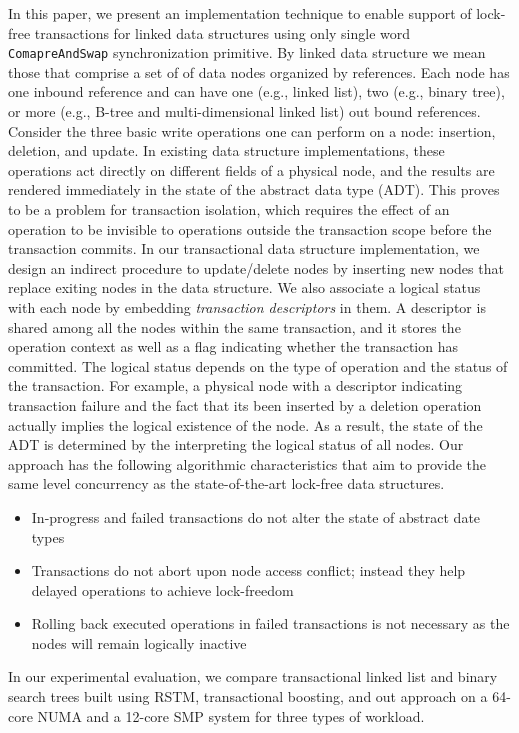 \documentclass[10pt,conference,compsocconf]{IEEEtran}
\begin{document}
In this paper, we present an implementation technique to enable support of lock-free transactions for linked data structures using only single word \texttt{ComapreAndSwap} synchronization primitive.
By linked data structure we mean those that comprise a set of of data nodes organized by references. 
Each node has one inbound reference and can have one (e.g., linked list), two (e.g., binary tree), or more (e.g., B-tree and multi-dimensional linked list) out bound references.
Consider the three basic write operations one can perform on a node: insertion, deletion, and update.
In existing data structure implementations, these operations act directly on different fields of a physical node, and the results are rendered immediately in the state of the abstract data type (ADT).
This proves to be a problem for transaction isolation, which requires the effect of an operation to be invisible to operations outside the transaction scope before the transaction commits.
In our transactional data structure implementation, we design an indirect procedure to update/delete nodes by inserting new nodes that replace exiting nodes in the data structure.
We also associate a logical status with each node by embedding \emph{transaction descriptors} in them.
A descriptor is shared among all the nodes within the same transaction, and it stores the operation context as well as a flag indicating whether the transaction has committed.
The logical status depends on the type of operation and the status of the transaction.
For example, a physical node with a descriptor indicating transaction failure and the fact that its been inserted by a deletion operation actually implies the logical existence of the node.
As a result, the state of the ADT is determined by the interpreting the logical status of all nodes.
Our approach has the following algorithmic characteristics that aim to provide the same level concurrency as the state-of-the-art lock-free data structures.
\begin{itemize}
    \item In-progress and failed transactions do not alter the state of abstract date types
    \item Transactions do not abort upon node access conflict; instead they help delayed operations to achieve lock-freedom
    \item Rolling back executed operations in failed transactions is not necessary as the nodes will remain logically inactive
\end{itemize}

In our experimental evaluation, we compare transactional linked list and binary search trees built using RSTM, transactional boosting, and out approach on a 64-core NUMA and a 12-core SMP system for three types of workload. 
\end{document}
